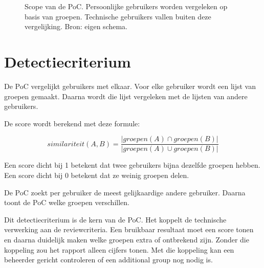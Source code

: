 \begin{figure}[htbp]
	\centering
	\caption[Scope van de PoC]{Scope van de PoC. Persoonlijke gebruikers worden vergeleken op basis van groepen. Technische gebruikers vallen buiten deze vergelijking. Bron: eigen schema.}
	\label{fig:scope-poc}
\end{figure}

\section{Detectiecriterium}

De PoC vergelijkt gebruikers met elkaar. Voor elke gebruiker wordt een lijst van groepen gemaakt. Daarna wordt die lijst vergeleken met de lijsten van andere gebruikers.

De score wordt berekend met deze formule:

\[
similariteit(A,B) = \frac{|groepen(A) \cap groepen(B)|}{|groepen(A) \cup groepen(B)|}
\]

Een score dicht bij 1 betekent dat twee gebruikers bijna dezelfde groepen hebben. Een score dicht bij 0 betekent dat ze weinig groepen delen.

De PoC zoekt per gebruiker de meest gelijkaardige andere gebruiker. Daarna toont de PoC welke groepen verschillen.

Dit detectiecriterium is de kern van de PoC. Het koppelt de technische verwerking aan de reviewcriteria. Een bruikbaar resultaat moet een score tonen en daarna duidelijk maken welke groepen extra of ontbrekend zijn. Zonder die koppeling zou het rapport alleen cijfers tonen. Met die koppeling kan een beheerder gericht controleren of een additional group nog nodig is.

